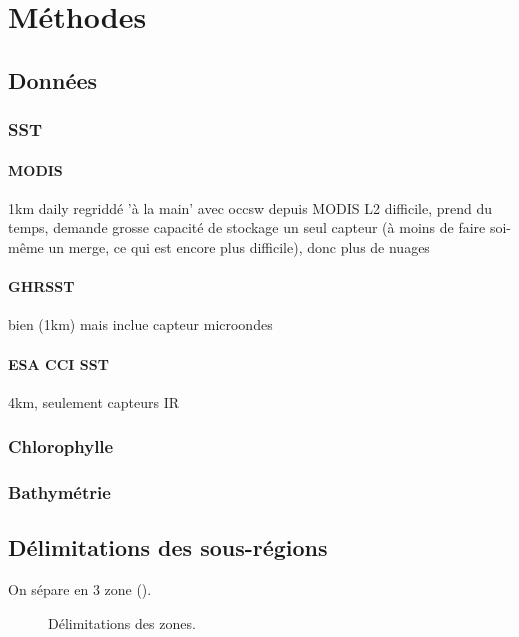 
\chapter{Méthodes}

\section{Données}

\subsection{SST}

\subsubsection{MODIS}
1km daily
regriddé 'à la main' avec occsw depuis MODIS L2
difficile, prend du temps, demande grosse capacité de stockage
un seul capteur (à moins de faire soi-même un merge, ce qui est encore plus difficile), donc plus de nuages

\subsubsection{GHRSST}
bien (1km) mais inclue capteur microondes

\subsubsection{ESA CCI SST}
4km, seulement capteurs IR

\subsection{Chlorophylle}

\subsection{Bathymétrie}

\section{Délimitations des sous-régions}

On sépare en 3 zone ().

\begin{figure}
  \caption{Délimitations des zones.}
  \label{fig:zone-delimitation}
\end{figure}

